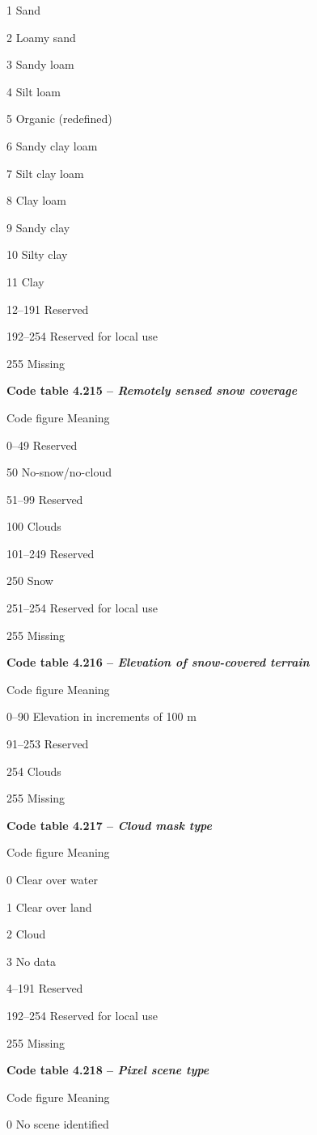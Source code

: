 1 Sand

2 Loamy sand

3 Sandy loam

4 Silt loam

5 Organic (redefined)

6 Sandy clay loam

7 Silt clay loam

8 Clay loam

9 Sandy clay

10 Silty clay

11 Clay

12--191 Reserved

192--254 Reserved for local use

255 Missing

\textbf{Code table 4.215 -- \emph{Remotely sensed snow coverage}}

Code figure Meaning

0--49 Reserved

50 No-snow/no-cloud

51--99 Reserved

100 Clouds

101--249 Reserved

250 Snow

251--254 Reserved for local use

255 Missing

\textbf{Code table 4.216 -- \emph{Elevation of snow-covered terrain}}

Code figure Meaning

0--90 Elevation in increments of 100 m

91--253 Reserved

254 Clouds

255 Missing

\textbf{Code table 4.217 -- \emph{Cloud mask type}}

Code figure Meaning

0 Clear over water

1 Clear over land

2 Cloud

3 No data

4--191 Reserved

192--254 Reserved for local use

255 Missing

\textbf{Code table 4.218 -- \emph{Pixel scene type}}

Code figure Meaning

0 No scene identified

